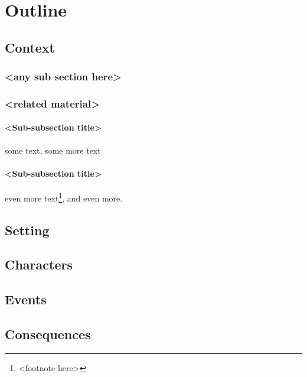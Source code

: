 \chapter{Outline}

\section{Context}
\subsection{<any sub section here>}

\subsection{<related material>}

\subsubsection{<Sub-subsection title>}
some text\cite{citation-1-name-here}, some more text

\subsubsection{<Sub-subsection title>}
even more text\footnote{<footnote here>}, and even more.

\section{Setting}

\section{Characters}

\section{Events}

\section{Consequences}
